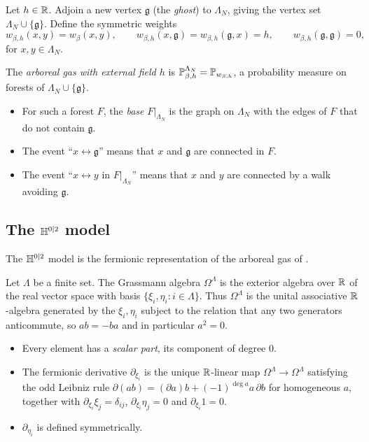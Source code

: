 \documentclass[11pt]{amsart}
\numberwithin{equation}{section}
\numberwithin{theorem}{section}
\newcommand{\conn}{\leftrightarrow}
\newcommand{\ghost}{\mathfrak{g}}
\begin{document}
\begin{definition}\label{def:ghost}
Let $h\in\R$. Adjoin a new vertex $\ghost$ (the \emph{ghost}) to $\Lambda_N$, giving the vertex set
$\Lambda_N\cup\{\ghost\}$. Define the symmetric weights
\begin{equation}\label{e:ghostW}
  w_{\beta,h}(x,y)=w_\beta(x,y),\qquad w_{\beta,h}(x,\ghost)=w_{\beta,h}(\ghost,x)=h,\qquad
  w_{\beta,h}(\ghost,\ghost)=0,
\end{equation}
for $x,y\in\Lambda_N$.

The \emph{arboreal gas with external field $h$} is $\P^{\Lambda_N}_{\beta,h}=\P_{w_{\beta,h}}$,
a probability measure on forests of $\Lambda_N\cup\{\ghost\}$.
\begin{itemize}
\item For such a forest $F$, the \emph{base} $F|_{\Lambda_N}$ is the graph on $\Lambda_N$ with
  the edges of $F$ that do not contain $\ghost$.
\item The event ``$x\conn\ghost$'' means that $x$ and $\ghost$ are connected in $F$.
\item The event ``$x\conn y$ in $F|_{\Lambda_N}$'' means that $x$ and $y$ are connected by a walk
  avoiding $\ghost$.
\end{itemize}
\end{definition}

\subsection{\texorpdfstring{The $\HH^{0|2}$ model}{The H02 model}}

The $\HH^{0|2}$ model is the fermionic representation of the arboreal gas of \cite{BCH24}.

\begin{definition}\label{def:grassmann}
Let $\Lambda$ be a finite set. The Grassmann algebra $\Omega^{\Lambda}$ is the exterior algebra
over $\R$ of the real vector space with basis $\{\xi_i,\eta_i : i\in\Lambda\}$. Thus
$\Omega^{\Lambda}$ is the unital associative $\R$-algebra generated by the $\xi_i,\eta_i$
subject to the relation that any two generators anticommute, so $ab=-ba$ and in particular
$a^2=0$.
\begin{itemize}
\item Every element has a \emph{scalar part}, its component of degree $0$.
\item The fermionic derivative $\partial_{\xi_i}$ is the unique $\R$-linear map
  $\Omega^\Lambda\to\Omega^\Lambda$ satisfying the odd Leibniz rule
  $\partial(ab)=(\partial a)b+(-1)^{\deg a}a\,\partial b$ for homogeneous $a$, together with
  $\partial_{\xi_i}\xi_j=\delta_{ij}$, $\partial_{\xi_i}\eta_j=0$ and $\partial_{\xi_i}1=0$.
\item $\partial_{\eta_i}$ is defined symmetrically.
\end{itemize}
\end{definition}
\end{document}
